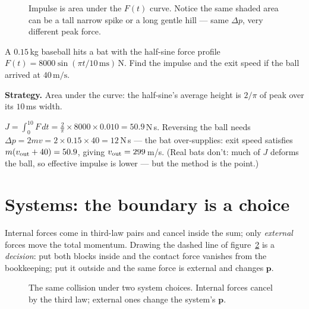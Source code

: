 \begin{figure}[htbp]\centering

\caption{Impulse is area under the $F(t)$ curve. Notice the same shaded
area can be a tall narrow spike or a long gentle hill --- same $\Delta p$,
very different peak force.}
\label{fig:impulse}
\end{figure}

\begin{example}\label{ex:impulse}
A $0.15$\,kg baseball hits a bat with the half-sine force profile
$F(t)=8000\sin(\pi t/10\,\mathrm{ms})$\,N. Find the impulse and the exit
speed if the ball arrived at $40\,\mathrm{m/s}$.
\par\smallskip
\textbf{Strategy.} Area under the curve: the half-sine's average height is
$2/\pi$ of peak over its $10$\,ms width.
\begin{solution}
$J=\int_0^{10}F\,dt=\frac{2}{\pi}\times8000\times0.010=50.9$\,N\,s.
Reversing the ball needs $\Delta p=2mv=2\times0.15\times40=12$\,N\,s ---
the bat over-supplies: exit speed satisfies
$m(v_{\rm out}+40)=50.9$, giving $v_{\rm out}=299$\,m/s. (Real bats don't:
much of $J$ deforms the ball, so effective impulse is lower --- but the
method is the point.) \checkmark
\end{solution}
\end{example}

\section{Systems: the boundary is a choice}\label{sec:mom-sys}

Internal forces come in third-law pairs and cancel inside the sum; only
\emph{external} forces move the total momentum. Drawing the dashed line of
figure~\ref{fig:boundary} is a \emph{decision}: put both blocks inside and
the contact force vanishes from the bookkeeping; put it outside and the
same force is external and changes $\mathbf p$.

\begin{figure}[htbp]\centering

\caption{The same collision under two system choices. Internal forces
cancel by the third law; external ones change the system's $\mathbf p$.}
\label{fig:boundary}
\end{figure}

